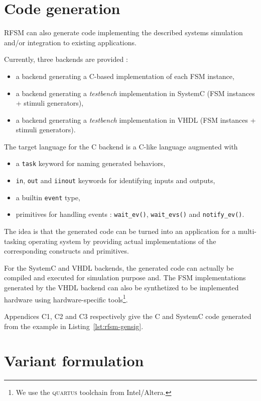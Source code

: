\section*{Code generation}
\label{sec:code-generation-1}

RFSM can also generate code implementing the described systems simulation and/or
integration to existing applications.

\medskip
Currently, three backends are provided :
\begin{itemize}
\item a backend generating a C-based implementation of each FSM instance,
\item a backend generating a \emph{testbench} implementation in SystemC (FSM instances + stimuli
  generators),
\item a backend generating a \emph{testbench} implementation in VHDL (FSM instances + stimuli
  generators).
\end{itemize}

\medskip
The target language for the C backend is a C-like language augmented with
\begin{itemize}
\item a \verb|task| keyword for naming generated behaviors,
\item \verb|in|, \verb|out| and \verb|iinout| keywords for identifying inputs and outputs,
\item a builtin \verb|event| type,
\item primitives for handling events : \verb|wait_ev()|, \verb|wait_evs()| and
  \verb|notify_ev()|. 
\end{itemize}
The idea is that the generated code can be turned into an application for a multi-tasking operating
system by providing actual implementations of the corresponding constructs and primitives.

\medskip
For the SystemC and VHDL backends, the generated code can actually be compiled and executed for
simulation purpose and. The FSM implementations generated by the VHDL backend can also be
synthetized to be implemented hardware using hardware-specific tools\footnote{We use the
  \textsc{quartus} toolchain from Intel/Altera.}. 

\medskip
Appendices C1, C2 and C3 respectively give the C and SystemC code generated from the example in
Listing~\ref{lst:rfsm-gensig}. 

\section*{Variant formulation}
\label{sec:variant-formulation}

